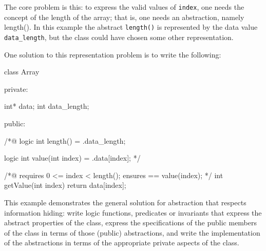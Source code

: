 The core problem is this: to express the valid values of \lstinline|index|, one needs the concept of the length of the array; that is, one needs an abstraction, namely length(). In this example the abstract \lstinline|length()| is represented by the data value \lstinline|data_length|, but the class could have chosen some other representation.

One solution to this representation problem is to write the following:

\begin{listing-nonumber}
class Array {
	
  private:
	
	int* data;
	int data_length;
	
  public:
	
	/*@
	   logic int length() = \this.data_length; 
	   
	   logic int value(int index) = \this.data[index];
	*/
	
	/*@ 
	   requires 0 <= index < length();
	   ensures \result == value(index);
	*/
	int getValue(int index) {
		return data[index];
	}
}
\end{listing-nonumber}

This example demonstrates the general solution for abstraction that respects information hiding: write logic functions, predicates or invariants that express the abstract properties of the class, express the specifications of the public members of the class in terms of those (public) abstractions, and write the implementation of the abstractions in terms of the appropriate private aspects of the class.

